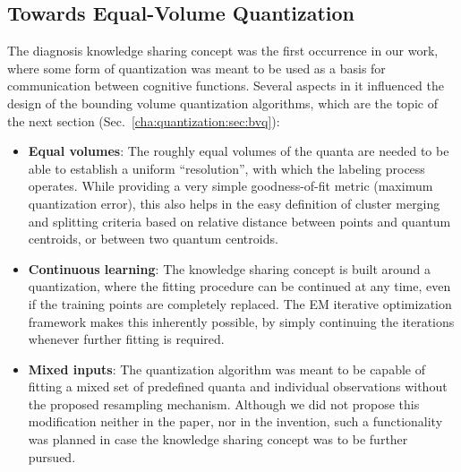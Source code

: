%			


		\subsection{Towards Equal-Volume Quantization}
		
			The diagnosis knowledge sharing concept was the first occurrence in our work, where some form of quantization was meant to be used as a basis for communication between cognitive functions.
			Several aspects in it influenced the design of the bounding volume quantization algorithms, which are the topic of the next section (Sec.~\ref{cha:quantization:sec:bvq}):
			\begin{itemize}
				\item 
					\textbf{Equal volumes}:
					The roughly equal volumes of the quanta are needed to be able to establish a uniform ``resolution'', with which the labeling process operates.
					While providing a very simple goodness-of-fit metric (maximum quantization error), this also helps in the easy definition of cluster merging and splitting criteria based on relative distance between points and quantum centroids, or between two quantum centroids.
				
				\item
					\textbf{Continuous learning}:
					The knowledge sharing concept is built around a quantization, where the fitting procedure can be continued at any time, even if the training points are completely replaced.
					The \ac{EM} iterative optimization framework makes this inherently possible, by simply continuing the iterations whenever further fitting is required.
				
				\item
					\textbf{Mixed inputs}:
					The quantization algorithm was meant to be capable of fitting a mixed set of predefined quanta and individual observations without the proposed resampling mechanism.
					Although we did not propose this modification neither in the paper, nor in the invention, such a functionality was planned in case the knowledge sharing concept was to be further pursued.					
			\end{itemize}
			
